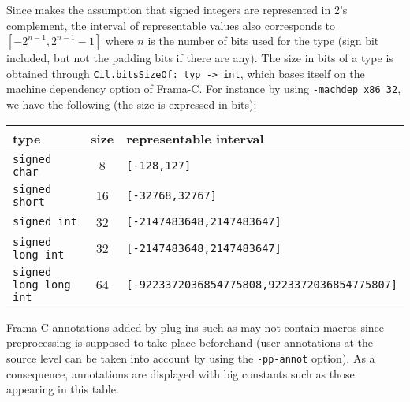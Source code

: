 Since \rte{} makes the assumption that signed integers are represented in 2's
complement, the interval of representable values also corresponds to $[-2^{n-1},
  2^{n-1}-1]$ where $n$ is the number of bits used for the type (sign bit
included, but not the padding bits if there are any).  The size in bits of a
type is obtained through \lstinline|Cil.bitsSizeOf: typ -> int|, which bases
itself on the machine dependency option of Frama-C. For instance by using
\lstinline|-machdep x86_32|, we have the following (the size is expressed in
bits):
\begin{center}
\begin{tabular}{|l|c|l|}
\hline
type & size & representable interval \\
\hline
\lstinline|signed char| & 8 & \lstinline|[-128,127]|  \\
\lstinline|signed short| & 16 & \lstinline|[-32768,32767]| \\
\lstinline|signed int| & 32 & \lstinline|[-2147483648,2147483647]| \\
\lstinline|signed long int| & 32 & \lstinline|[-2147483648,2147483647]| \\
\lstinline|signed long long int| & 64 & \lstinline|[-9223372036854775808,9223372036854775807]| \\
\hline
\end{tabular}
\end{center}

\medskip
Frama-C annotations added by plug-ins such as \rte{} may not contain macros
since preprocessing is supposed to take place beforehand (user annotations at
the source level can be taken into account by using the \lstinline|-pp-annot|
option).  As a consequence, annotations are displayed with big constants such as
those appearing in this table.

